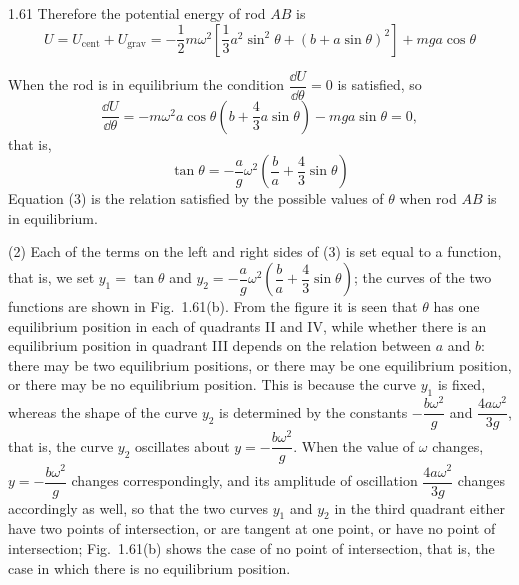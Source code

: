 \begin{solution}{1.61}
Therefore the potential energy of rod $AB$ is
\begin{equation}
U=U_{\text{cent}}+U_{\text{grav}}
=-\frac{1}{2}m\omega^2\left[\frac{1}{3}a^2\sin^2\theta+(b+a\sin\theta)^2\right]+mga\cos\theta \tag{2}
\end{equation}

When the rod is in equilibrium the condition $\dfrac{\dd U}{\dd\theta}=0$ is satisfied, so
\[
\frac{\dd U}{\dd\theta}=-m\omega^2a\cos\theta\left(b+\frac{4}{3}a\sin\theta\right)-mga\sin\theta=0,
\]
that is,
\begin{equation}
\tan\theta=-\frac{a}{g}\omega^2\left(\frac{b}{a}+\frac{4}{3}\sin\theta\right) \tag{3}
\end{equation}
Equation (3) is the relation satisfied by the possible values of $\theta$ when rod $AB$ is in equilibrium.

(2) Each of the terms on the left and right sides of (3) is set equal to a function, that is, we set $y_1=\tan\theta$ and $y_2=-\dfrac{a}{g}\omega^2\left(\dfrac{b}{a}+\dfrac{4}{3}\sin\theta\right)$; the curves of the two functions are shown in Fig.~1.61(b). From the figure it is seen that $\theta$ has one equilibrium position in each of quadrants II and IV, while whether there is an equilibrium position in quadrant III depends on the relation between $a$ and $b$: there may be two equilibrium positions, or there may be one equilibrium position, or there may be no equilibrium position. This is because the curve $y_1$ is fixed, whereas the shape of the curve $y_2$ is determined by the constants $-\dfrac{b\omega^2}{g}$ and $\dfrac{4a\omega^2}{3g}$, that is, the curve $y_2$ oscillates about $y=-\dfrac{b\omega^2}{g}$. When the value of $\omega$ changes, $y=-\dfrac{b\omega^2}{g}$ changes correspondingly, and its amplitude of oscillation $\dfrac{4a\omega^2}{3g}$ changes accordingly as well, so that the two curves $y_1$ and $y_2$ in the third quadrant either have two points of intersection, or are tangent at one point, or have no point of intersection; Fig.~1.61(b) shows the case of no point of intersection, that is, the case in which there is no equilibrium position.


\end{solution}
